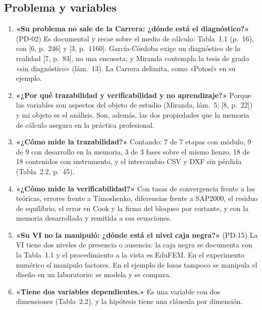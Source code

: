 \documentclass[11pt,a4paper]{article}
\begin{document}
\subsection{Problema y variables}
\begin{enumerate}[resume*=preg]
\item \textbf{«Su problema no sale de la Carrera: ¿dónde está el diagnóstico?»} (PD-02) Es documental y recae sobre el medio de cálculo: Tabla~1.1 (p.~16), con [6, p.~246] y [3, p.~1160]. García-Córdoba exige un diagnóstico de la realidad [7, p.~83], no una encuesta; y Miranda contempla la tesis de grado «sin diagnóstico» (lám.~13). La Carrera delimita, como «Potosí» en su ejemplo.
\item \textbf{«¿Por qué trazabilidad y verificabilidad y no aprendizaje?»} Porque las variables son aspectos del objeto de estudio (Miranda, lám.~5; [8, p.~22]) y mi objeto es el análisis. Son, además, las dos propiedades que la memoria de cálculo asegura en la práctica profesional.
\item \textbf{«¿Cómo mide la trazabilidad?»} Contando: 7 de 7 etapas con módulo, 9 de 9 con desarrollo en la memoria, 3 de 3 fases sobre el mismo lienzo, 18 de 18 contenidos con instrumento, y el intercambio CSV y DXF sin pérdida (Tabla~2.2, p.~45).
\item \textbf{«¿Cómo mide la verificabilidad?»} Con tasas de convergencia frente a las teóricas, errores frente a Timoshenko, diferencias frente a SAP2000, el residuo de equilibrio, el error en Cook y la firma del bloqueo por cortante, y con la memoria desarrollada y remitida a sus ecuaciones.
\item \textbf{«Su VI no la manipuló: ¿dónde está el nivel caja negra?»} (PD-15) La VI tiene dos niveles de presencia o ausencia: la caja negra se documenta con la Tabla~1.1 y el procedimiento a la vista es EduFEM. En el experimento numérico sí manipulo factores. En el ejemplo de losas tampoco se manipula el diseño en un laboratorio: se modela y se compara.
\item \textbf{«Tiene dos variables dependientes.»} Es una variable con dos dimensiones (Tabla~2.2), y la hipótesis tiene una cláusula por dimensión.
\end{enumerate}
\end{document}
